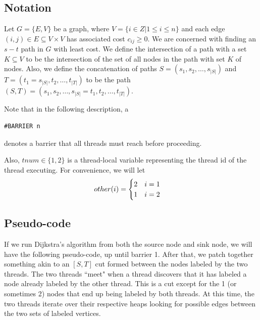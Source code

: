 \documentclass{article}
\begin{document}
\subsection{Notation}
Let $G = \{E, V\}$ be a graph, where $V = \{i\in Z| 1\le i \le n\}$ and each edge $(i,j) \in E \subseteq V \times V$ has associated cost $c_{ij} \ge 0$.
We are concerned with finding an $s-t$ path in $G$ with least cost.
We define the intersection of a path with a set $K\subseteq V$ to be the intersection of the set of all nodes in the path with set $K$ of nodes.
Also, we define the concatenation of paths $S=(s_1, s_2, \ldots, s_{|S|})$ and $T=(t_1=s_{|S|}, t_2, \ldots, t_{|T|})$
to be the path $(S,T) = (s_1, s_2, \ldots, s_{|S|} = t_1, t_2, \ldots, t_{|T|})$.

Note that in the following description, a
\begin{lstlisting}
#BARRIER n
\end{lstlisting}
denotes a barrier that all threads must reach before proceeding.

Also, $tnum \in \{1,2\}$ is a thread-local variable representing the thread id of the thread executing.
For convenience, we will let 
\[
 other(i) =
  \begin{cases} 
      2 \hfill \quad i = 1 \\
      1 \hfill \quad i = 2 \\
  \end{cases}
\]

\subsection{Pseudo-code}

If we run Dijkstra's algorithm from both the source node and sink node, we will have the following pseudo-code, up until barrier 1.
After that, we patch together something akin to an $[S,T]$ cut formed between the nodes labeled by the two threads.
The two threads ``meet" when a thread discovers that it has labeled a node already labeled by the other thread.
This is a cut except for the 1 (or sometimes 2) nodes that end up being labeled by both threads.
At this time, the two threads iterate over their respective heaps looking for possible edges between the two sets of labeled vertices.
\end{document}
